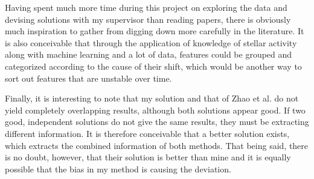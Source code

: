 Having spent much more time during this project on exploring the data and devising solutions with my supervisor than reading papers, there is obviously much inspiration to gather from digging down more carefully in the literature. It is also conceivable that through the application of knowledge of stellar activity along with machine learning and a lot of data, features could be grouped and categorized according to the cause of their shift, which would be another way to sort out features that are unstable over time.

Finally, it is interesting to note that my solution and that of Zhao et al. do not yield completely overlapping results, although both solutions appear good. If two good, independent solutions do not give the same results, they must be extracting different information. It is therefore conceivable that a better solution exists, which extracts the combined information of both methods. That being said, there is no doubt, however, that their solution is better than mine and it is equally possible that the bias in my method is causing the deviation.